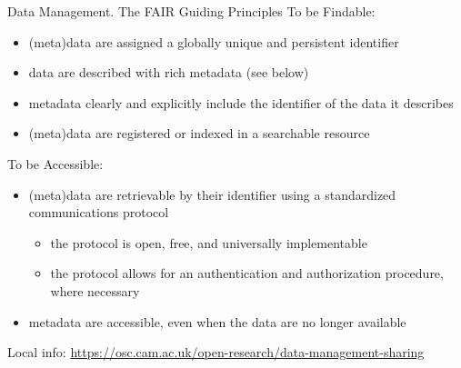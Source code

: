 \documentclass[ignorenonframetext,aspectratio=169,10pt,xcolor=table]{beamer}
\begin{document}
\begin{frame}{Data Management. The FAIR Guiding Principles} 
To be Findable:
\begin{itemize}
\item (meta)data are assigned a globally unique and persistent identifier
\item data are described with rich metadata (see below)
\item metadata clearly and explicitly include the identifier of the data it describes
\item (meta)data are registered or indexed in a searchable resource
\end{itemize}

To be Accessible:
\begin{itemize}
\item (meta)data are retrievable by their identifier using a standardized communications protocol
\begin{itemize}
\item the protocol is open, free, and universally implementable
\item the protocol allows for an authentication and authorization procedure, where necessary
\end{itemize}
\item metadata are accessible, even when the data are no longer available
\end{itemize}

\begin{flushright}
{\tiny
Local info: \url{https://osc.cam.ac.uk/open-research/data-management-sharing}}
\end{flushright}
\end{frame}
\end{document}
